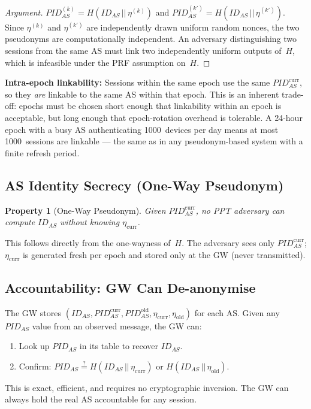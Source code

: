 \documentclass[12pt,a4paper]{article}
\newtheorem{property}{Property}[section]
\newcommand{\IDas}{\mathit{ID}_{AS}}
\newcommand{\PIDas}{\mathit{PID}_{AS}}
\newcommand{\PIDascurr}{\mathit{PID}_{AS}^{\mathrm{curr}}}
\newcommand{\PIDASOld}{\mathit{PID}_{AS}^{\mathrm{old}}}
\newcommand{\etacurr}{\eta_{\mathrm{curr}}}
\newcommand{\etaold}{\eta_{\mathrm{old}}}
\begin{document}
\begin{proof}[Argument]
$\PIDas^{(k)} = H(\IDas \,||\, \eta^{(k)})$ and
$\PIDas^{(k')} = H(\IDas \,||\, \eta^{(k')})$.
Since $\eta^{(k)}$ and $\eta^{(k')}$ are independently drawn uniform
random nonces, the two pseudonyms are computationally independent.
An adversary distinguishing two sessions from the same AS must
link two independently uniform outputs of~$H$, which is infeasible
under the PRF assumption on~$H$.
\end{proof}

\textbf{Intra-epoch linkability:} Sessions within the same epoch use
the same $\PIDascurr$, so they \emph{are} linkable to the same AS
within that epoch.  This is an inherent trade-off: epochs must be
chosen short enough that linkability within an epoch is acceptable,
but long enough that epoch-rotation overhead is tolerable.
A 24-hour epoch with a busy AS authenticating 1000~devices per day
means at most 1000~sessions are linkable --- the same as in any
pseudonym-based system with a finite refresh period.

\subsection{AS Identity Secrecy (One-Way Pseudonym)}

\begin{property}[One-Way Pseudonym]
Given $\PIDascurr$, no PPT adversary can compute $\IDas$ without
knowing $\etacurr$.
\end{property}

This follows directly from the one-wayness of~$H$.
The adversary sees only $\PIDascurr$; $\etacurr$ is generated fresh
per epoch and stored only at the GW (never transmitted).

\subsection{Accountability: GW Can De-anonymise}

The GW stores $(\IDas, \PIDascurr, \PIDASOld, \etacurr, \etaold)$
for each AS.  Given any $\PIDas$ value from an observed message,
the GW can:
\begin{enumerate}
  \item Look up $\PIDas$ in its table to recover $\IDas$.
  \item Confirm: $\PIDas \stackrel{?}{=} H(\IDas \,||\, \etacurr)$
        or $H(\IDas \,||\, \etaold)$.
\end{enumerate}
This is exact, efficient, and requires no cryptographic inversion.
The GW can always hold the real AS accountable for any session.
\end{document}
